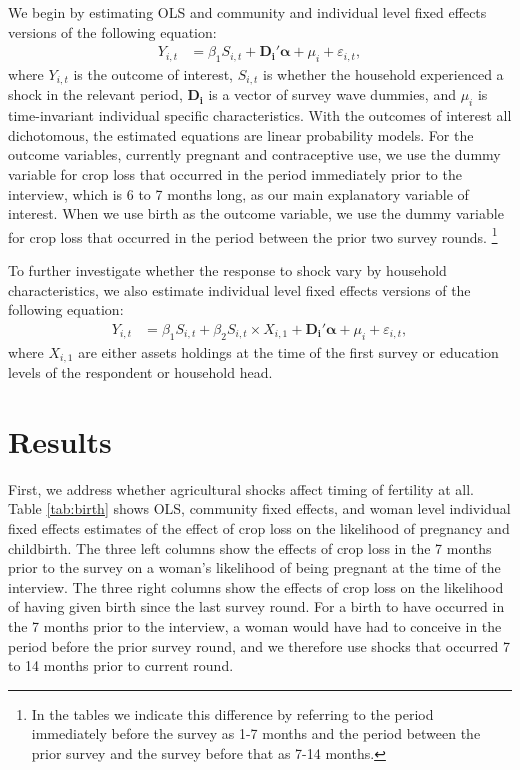 \documentclass[letterpaper,12pt]{article}
\begin{document}
We begin by estimating OLS and community and individual level fixed effects 
versions of the following equation:
\begin{align}
Y_{i,t} &=  \beta_1 S_{i,t}  +\boldsymbol{D_{i}}'\boldsymbol{\alpha} 
+ \mu_i + \varepsilon_{i,t},   \label{eq:fixed_effects} 
\end{align}
where $Y_{i,t}$ is the outcome of interest,  
$S_{i,t}$ is whether the household experienced a shock in the relevant period,
$\boldsymbol{D_{i}}$ is a vector of survey wave dummies, 
and $\mu_i$ is time-invariant individual specific characteristics.
With the outcomes of interest all dichotomous, the estimated equations 
are linear probability models. 
For the outcome variables, currently pregnant and contraceptive use, we use 
the dummy variable for crop loss that occurred in the period immediately 
prior to the interview, which is 6 to 7 months long, as our main explanatory 
variable of interest. 
When we use birth as the outcome variable, 
we use the dummy variable for crop loss that occurred in the period between 
the prior two survey rounds.%
\footnote{
In the tables we indicate this difference by referring to the period 
immediately before the survey as 1-7 months and the period between the
prior survey and the survey before that as 7-14 months.
}

To further investigate whether the response to shock vary by household
characteristics, we also estimate individual level fixed effects versions 
of the following equation:
\begin{align}
Y_{i,t} &=  \beta_1 S_{i,t}  +  \beta_2 S_{i,t} \times X_{i,1} +
\boldsymbol{D_{i}}'\boldsymbol{\alpha} + \mu_i + \varepsilon_{i,t},   
\label{eq:fixed_effects} 
\end{align}
where $X_{i,1}$ are either assets holdings at the time of the first
survey or education levels of the respondent or household head.



\section{Results}


First, we address whether agricultural shocks affect timing of fertility at all.
Table \ref{tab:birth} shows OLS, community fixed effects, and woman level individual 
fixed effects estimates of the effect of crop loss on the likelihood of pregnancy 
and childbirth.
The three left columns show the effects of crop loss in the 7 months prior to the
survey on a woman's likelihood of being pregnant at the time of the interview.
The three right columns show the effects of crop loss on the likelihood of having given 
birth since the last survey round. 
For a birth to have occurred in the 7 months prior to the interview, a woman would have
had to conceive in the period before the prior survey round, and we therefore use shocks
that occurred 7 to 14 months prior to current round.
\end{document}
